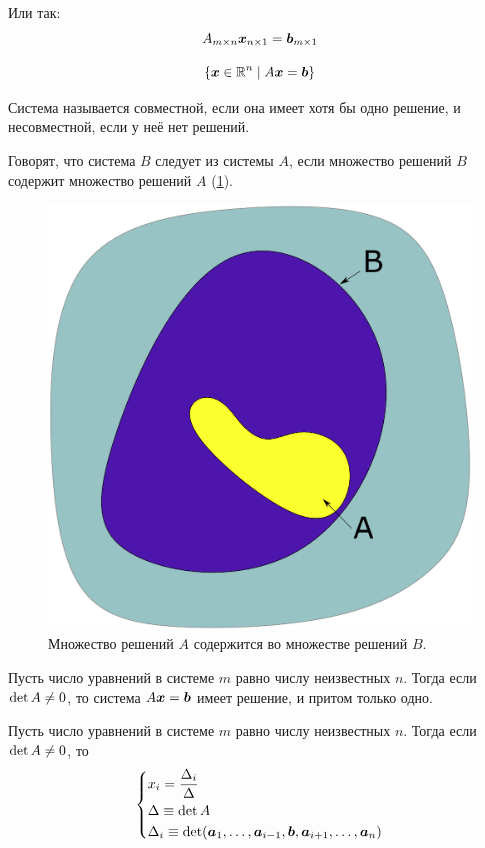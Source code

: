 \documentclass[a4paper,12pt]{article}
\begin{document}
  Или так:
  \[
    A_{m \times n} \boldsymbol x_{n \times 1} = \boldsymbol b_{m \times 1}
  \]
  
  \begin{definition}
    \[
      \{\boldsymbol x \in \operatorname{\mathbb R}^n \mid A \boldsymbol x = \boldsymbol b\}
    \]
  \end{definition}
  
  \begin{definition}
    Система называется совместной, если она имеет хотя бы одно решение, и несовместной, если у неё нет решений.
  \end{definition}
  
  \begin{definition}
    Говорят, что система $B$ следует из системы $A$, если множество решений $B$ содержит множество решений $A$ (\ref{fig:a-and-b-sets}).
  \end{definition}
  
  \begin{figure}[h]
    \centering
    
    \includegraphics[width=0.5\columnwidth]{a-and-b-sets}
    
    \caption{Множество решений $A$ содержится во множестве решений $B$.}
    \label{fig:a-and-b-sets}
  \end{figure}
  
  \begin{theorem}
    Пусть число уравнений в системе $m$ равно числу неизвестных $n$.
    Тогда если $\det A \hm{\not=} 0$, то система $A \bds x \hm= \bds b$ имеет решение, и притом только одно.
  \end{theorem}
  
  \begin{theorem}
    Пусть число уравнений в системе $m$ равно числу неизвестных $n$.
    Тогда если $\det A \hm{\not=} 0$, то
    \[
      \left\{
        \begin{aligned}
          &x_i = \frac{\Delta_i}{\Delta}\\
          &\Delta \equiv \det A\\
          &\Delta_i \equiv \det (\boldsymbol a_1, \ldots, \boldsymbol a_{i - 1}, \boldsymbol b, \boldsymbol a_{i + 1}, \ldots, \boldsymbol a_n)
        \end{aligned}
      \right.
    \]
  \end{theorem}
  
\end{document}

